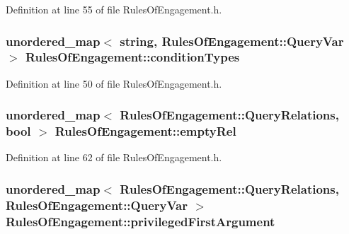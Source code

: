 Definition at line 55 of file Rules\-Of\-Engagement.\-h.

\hypertarget{class_rules_of_engagement_a5f44ebe9fe8019b6415272f410673755}{
\subsubsection[{condition\-Types}]{\setlength{\rightskip}{0pt plus 5cm}unordered\-\_\-map$<$ string, {\bf Rules\-Of\-Engagement\-::\-Query\-Var} $>$ Rules\-Of\-Engagement\-::condition\-Types\hspace{0.3cm}{\ttfamily [static]}}}\label{class_rules_of_engagement_a5f44ebe9fe8019b6415272f410673755}


Definition at line 50 of file Rules\-Of\-Engagement.\-h.

\hypertarget{class_rules_of_engagement_a343933b8d961a5dfab7a3cdd979820cf}{
\subsubsection[{empty\-Rel}]{\setlength{\rightskip}{0pt plus 5cm}unordered\-\_\-map$<$ {\bf Rules\-Of\-Engagement\-::\-Query\-Relations}, bool $>$ Rules\-Of\-Engagement\-::empty\-Rel\hspace{0.3cm}{\ttfamily [static]}}}\label{class_rules_of_engagement_a343933b8d961a5dfab7a3cdd979820cf}


Definition at line 62 of file Rules\-Of\-Engagement.\-h.

\hypertarget{class_rules_of_engagement_a7dd292534cee25afe99b1187a6e07774}{
\subsubsection[{privileged\-First\-Argument}]{\setlength{\rightskip}{0pt plus 5cm}unordered\-\_\-map$<$ {\bf Rules\-Of\-Engagement\-::\-Query\-Relations}, {\bf Rules\-Of\-Engagement\-::\-Query\-Var} $>$ Rules\-Of\-Engagement\-::privileged\-First\-Argument\hspace{0.3cm}{\ttfamily [static]}}}\label{class_rules_of_engagement_a7dd292534cee25afe99b1187a6e07774}



